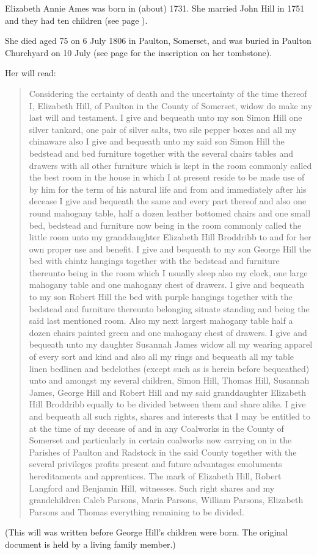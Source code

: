 
Elizabeth Annie Ames was born in (about) 1731.  She married John Hill in 1751 and they had ten children (see page \pageref{John_Hill}).

She died aged 75 on 6 July 1806 in Paulton, Somerset, and was buried in Paulton Churchyard on 10 July (see page \pageref{John_Hill} for the inscription on her tombstone).

Her will read:

\begin{quotation}
Considering the certainty of death and the uncertainty of the time thereof I, Elizabeth Hill, of Paulton in the County of Somerset, widow do make my last will and testament. I give and bequeath unto my son Simon Hill one silver tankard, one pair of silver salts, two sile pepper boxes and all my chinaware also I give and bequeath unto my said son Simon Hill the bedstead and bed furniture together with the several chairs tables and drawers with all other furniture which is kept in the room commonly called the best room in the house in which I at present reside to be made use of by him for the term of his natural life and from and immediately after his decease I give and bequeath the same and every part thereof and also one round mahogany table, half a dozen leather bottomed chairs and one small bed, bedstead and furniture now being in the room commonly called the little room unto my granddaughter Elizabeth Hill Broddribb to and for her own proper use and benefit. I give and bequeath to my son George Hill the bed with chintz hangings together with the bedstead and furniture thereunto being in the room which I usually sleep also my clock, one large mahogany table and one mahogany chest of drawers. I give and bequeath to my son Robert Hill the bed with purple hangings together with the bedstead and furniture thereunto belonging situate standing and being the said last mentioned room. Also my next largest mahogany table half a dozen chairs painted green and one mahogany chest of drawers. I give and bequeath unto my daughter Susannah James widow all my wearing apparel of every sort and kind and also all my rings and bequeath all my table linen bedlinen and bedclothes (except such as is herein before bequeathed) unto and amongst my several children, Simon Hill, Thomas Hill, Susannah James, George Hill and Robert Hill and my said granddaughter Elizabeth Hill Broddribb equally to be divided between them and share alike. I give and bequeath all such rights, shares and interests that I may be entitled to at the time of my decease of and in any Coalworks in the County of Somerset and particularly in certain coalworks now carrying on in the Parishes of Paulton and Radstock in the said County together with the several privileges profits present and future advantages emoluments hereditaments and apprentices. The mark of Elizabeth Hill, Robert Langford and Benjamin Hill, witnesses. Such right shares and my grandchildren Caleb Parsons, Maria Parsons, William Parsons, Elizabeth Parsons and Thomas everything remaining to be divided.
\end{quotation}

(This will was written before George Hill's children were born. The original document is held by a living family member.)
